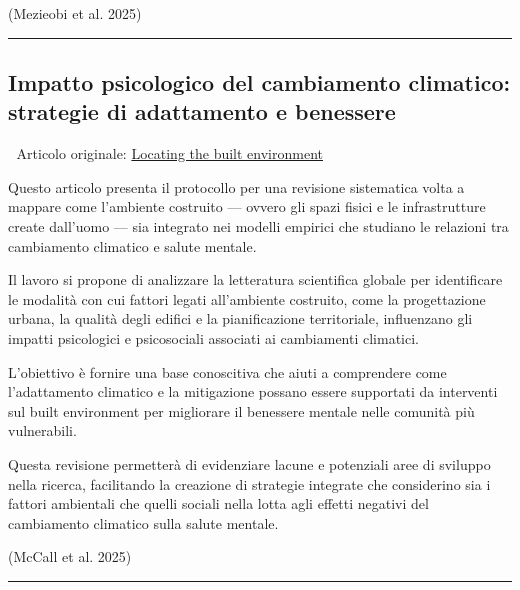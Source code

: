 \documentclass[
]{article}
\begin{document}
(Mezieobi et al. 2025)

\begin{center}\rule{0.5\linewidth}{0.5pt}\end{center}

\subsection{Impatto psicologico del cambiamento climatico: strategie di
adattamento e
benessere}\label{impatto-psicologico-del-cambiamento-climatico-strategie-di-adattamento-e-benessere}

📄 Articolo originale:
\href{https://www.sciencedirect.com/science/article/pii/S1877343524000800}{Locating
the built environment}

Questo articolo presenta il protocollo per una revisione sistematica
volta a mappare come l'ambiente costruito --- ovvero gli spazi fisici e
le infrastrutture create dall'uomo --- sia integrato nei modelli
empirici che studiano le relazioni tra cambiamento climatico e salute
mentale.

Il lavoro si propone di analizzare la letteratura scientifica globale
per identificare le modalità con cui fattori legati all'ambiente
costruito, come la progettazione urbana, la qualità degli edifici e la
pianificazione territoriale, influenzano gli impatti psicologici e
psicosociali associati ai cambiamenti climatici.

L'obiettivo è fornire una base conoscitiva che aiuti a comprendere come
l'adattamento climatico e la mitigazione possano essere supportati da
interventi sul built environment per migliorare il benessere mentale
nelle comunità più vulnerabili.

Questa revisione permetterà di evidenziare lacune e potenziali aree di
sviluppo nella ricerca, facilitando la creazione di strategie integrate
che considerino sia i fattori ambientali che quelli sociali nella lotta
agli effetti negativi del cambiamento climatico sulla salute mentale.

(McCall et al. 2025)

\begin{center}\rule{0.5\linewidth}{0.5pt}\end{center}
\end{document}
